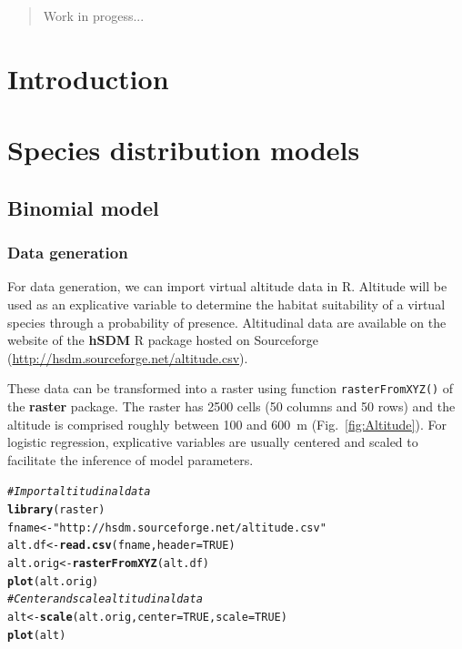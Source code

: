 \documentclass[a4paper, 12pt, leqno]{article}\usepackage[]{graphicx}\usepackage[]{color}
\makeatletter
\newcommand{\hlnum}[1]{\textcolor[rgb]{0.686,0.059,0.569}{#1}}%
\newcommand{\hlstr}[1]{\textcolor[rgb]{0.192,0.494,0.8}{#1}}%
\newcommand{\hlcom}[1]{\textcolor[rgb]{0.678,0.584,0.686}{\textit{#1}}}%
\newcommand{\hlstd}[1]{\textcolor[rgb]{0.345,0.345,0.345}{#1}}%
\newcommand{\hlkwb}[1]{\textcolor[rgb]{0.69,0.353,0.396}{#1}}%
\newcommand{\hlkwc}[1]{\textcolor[rgb]{0.333,0.667,0.333}{#1}}%
\newcommand{\hlkwd}[1]{\textcolor[rgb]{0.737,0.353,0.396}{\textbf{#1}}}%
\newenvironment{kframe}{%
 \def\at@end@of@kframe{}%
 \ifinner\ifhmode%
  \def\at@end@of@kframe{\end{minipage}}%
  \begin{minipage}{\columnwidth}%
 \fi\fi%
 \def\FrameCommand##1{\hskip\@totalleftmargin \hskip-\fboxsep
 \colorbox{shadecolor}{##1}\hskip-\fboxsep
     \hskip-\linewidth \hskip-\@totalleftmargin \hskip\columnwidth}%
 \MakeFramed {\advance\hsize-\width
   \@totalleftmargin\z@ \linewidth\hsize
   \@setminipage}}%
 {\par\unskip\endMakeFramed%
 \at@end@of@kframe}
\newenvironment{knitrout}{}{} %
\makeatother
\begin{document}
\begin{abstract}

  Work in progess...
  
  \vspace{0.5cm}


\end{abstract}

\newpage




\section{Introduction}

\section{Species distribution models}

\subsection{Binomial model}

\subsubsection{Data generation}

For data generation, we can import virtual altitude data in R. Altitude will be used as an
explicative variable to determine the habitat suitability of a virtual species through a
probability of presence. Altitudinal data are available on the website of the
\textbf{hSDM} R package hosted on Sourceforge
(\url{http://hsdm.sourceforge.net/altitude.csv}).

These data can be transformed into a raster using function \texttt{rasterFromXYZ()} of the
\textbf{raster} package. The raster has 2500 cells (50 columns and 50 rows) and the
altitude is comprised roughly between 100 and 600~m (Fig.~\ref{fig:Altitude}). For
logistic regression, explicative variables are usually centered and scaled to facilitate
the inference of model parameters.

\begin{knitrout}\small
{}\color{fgcolor}\begin{kframe}
\begin{alltt}
\hlcom{# Import altitudinal data}
\hlkwd{library}\hlstd{(raster)}
\hlstd{fname} \hlkwb{<-} \hlstr{"http://hsdm.sourceforge.net/altitude.csv"}
\hlstd{alt.df} \hlkwb{<-} \hlkwd{read.csv}\hlstd{(fname,}\hlkwc{header}\hlstd{=}\hlnum{TRUE}\hlstd{)}
\hlstd{alt.orig} \hlkwb{<-} \hlkwd{rasterFromXYZ}\hlstd{(alt.df)}
\hlkwd{plot}\hlstd{(alt.orig)}
\hlcom{# Center and scale altitudinal data}
\hlstd{alt} \hlkwb{<-} \hlkwd{scale}\hlstd{(alt.orig,}\hlkwc{center}\hlstd{=}\hlnum{TRUE}\hlstd{,}\hlkwc{scale}\hlstd{=}\hlnum{TRUE}\hlstd{)}
\hlkwd{plot}\hlstd{(alt)}
\end{alltt}
\end{kframe}
\end{knitrout}
\end{document}
